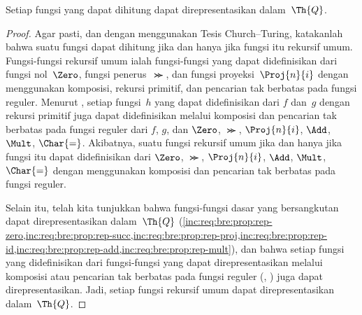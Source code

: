 \documentclass[../../../include/open-logic-section]{subfiles}
\begin{document}

\begin{thm}
Setiap fungsi yang dapat dihitung dapat direpresentasikan dalam~$\Th{Q}$.
\end{thm}

\begin{proof}
Agar pasti, dan dengan menggunakan Tesis Church--Turing, katakanlah bahwa
suatu fungsi dapat dihitung jika dan hanya jika fungsi itu rekursif umum.
Fungsi-fungsi rekursif umum ialah fungsi-fungsi yang dapat didefinisikan dari
fungsi nol~$\Zero$, fungsi penerus~$\Succ$, dan fungsi proyeksi~$\Proj{n}{i}$
dengan menggunakan komposisi, rekursi primitif, dan pencarian tak berbatas
pada fungsi reguler. Menurut , setiap fungsi~$h$
yang dapat didefinisikan dari $f$ dan~$g$ dengan rekursi primitif juga dapat
didefinisikan melalui komposisi dan pencarian tak berbatas pada fungsi
reguler dari $f$, $g$, dan $\Zero$, $\Succ$, $\Proj{n}{i}$, $\Add$, $\Mult$,
$\Char{=}$. Akibatnya, suatu fungsi rekursif umum jika dan hanya jika fungsi
itu dapat didefinisikan dari $\Zero$, $\Succ$, $\Proj{n}{i}$, $\Add$,
$\Mult$, $\Char{=}$ dengan menggunakan komposisi dan pencarian tak berbatas
pada fungsi reguler.

Selain itu, telah kita tunjukkan bahwa fungsi-fungsi dasar yang bersangkutan
dapat direpresentasikan dalam~$\Th{Q}$
(\cref{inc:req:bre:prop:rep-zero,inc:req:bre:prop:rep-succ,inc:req:bre:prop:rep-proj,inc:req:bre:prop:rep-id,inc:req:bre:prop:rep-add,inc:req:bre:prop:rep-mult}),
dan bahwa setiap fungsi yang didefinisikan dari fungsi-fungsi yang dapat
direpresentasikan melalui komposisi atau pencarian tak berbatas pada fungsi
reguler (,
) juga dapat direpresentasikan. Jadi, setiap
fungsi rekursif umum dapat direpresentasikan dalam~$\Th{Q}$.
\end{proof}
\end{document}

